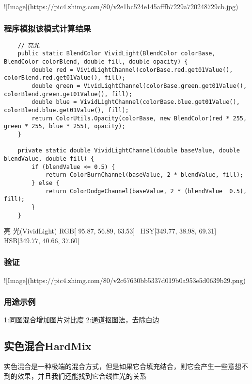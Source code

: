 ![Image](https://pic4.zhimg.com/80/v2e1bc524e145afffb7229a720248729cb.jpg)

\subsubsection{ 程序模拟该模式计算结果}
\begin{lstlisting}
	// 亮光
	public static BlendColor VividLight(BlendColor colorBase, BlendColor colorBlend, double fill, double opacity) {
		double red = VividLightChannel(colorBase.red.get01Value(), colorBlend.red.get01Value(), fill);
		double green = VividLightChannel(colorBase.green.get01Value(), colorBlend.green.get01Value(), fill);
		double blue = VividLightChannel(colorBase.blue.get01Value(), colorBlend.blue.get01Value(), fill);
		return ColorUtils.Opacity(colorBase, new BlendColor(red * 255, green * 255, blue * 255), opacity);
	}
	
	private static double VividLightChannel(double baseValue, double blendValue, double fill) {
		if (blendValue <= 0.5) {
			return ColorBurnChannel(baseValue, 2 * blendValue, fill);
		} else {
			return ColorDodgeChannel(baseValue, 2 * (blendValue  0.5), fill);
		}
	}
\end{lstlisting}



亮    光(VividLight)    RGB[ 95.87,  56.89,  63.53]~ HSY[349.77,  38.98,  69.31]~ HSB[349.77,  40.66,  37.60]


\subsubsection{ 验证}

![Image](https://pic4.zhimg.com/80/v2c67630bb5337d019b0a953e5d0639b29.png)

\subsubsection{ 用途示例}

1:同图混合增加图片对比度
2:通道抠图法，去除白边

\subsection{ 实色混合HardMix}

实色混合是一种极端的混合方式，但是如果它合填充结合，则它会产生一些意想不到的效果，并且我们还能找到它合线性光的关系

